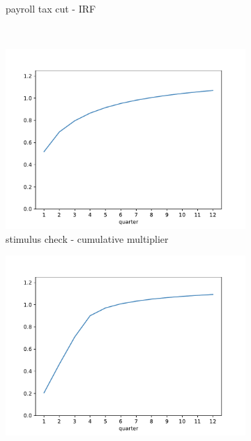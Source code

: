 \begin{figure}[htb]
\begin{subfigure}[b]{.33\linewidth}
		\caption{payroll tax cut - IRF}
		\label{fig:recessiontaxcutrelrecession}
	\end{subfigure}\\
		\begin{subfigure}[b]{.33\linewidth}
		\centering
		\includegraphics[width=\linewidth]{text/chapter3/Code/HA-Models/FromPandemicCode/Figures/Cummulative_multiplier_Check}
		\caption{stimulus check - cumulative multiplier}
		\label{fig:recessioncheckrelrecession_Mult}
	\end{subfigure}%
	\begin{subfigure}[b]{.33\linewidth}
		\centering
		\includegraphics[width=\linewidth]{text/chapter3/Code/HA-Models/FromPandemicCode/Figures/Cummulative_multiplier_UI}

\end{subfigure}
\end{figure}
